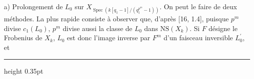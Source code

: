 \documentclass[9pt]{article}
\newcommand{\CanonText}[1]{\par{\fontsize{8.0}{9.35}\selectfont\RaggedRight #1\par}\vspace{2.2pt}}
\begin{document}
\begin{minipage}[t][\dimexpr\textheight-5pt\relax][t]{\textwidth}
\CanonText{a) Prolongement de \(L_{0}\) sur \(X_{\operatorname{Spec}(k[q_{1}-1]/(q_{1}^{p^{m}}-1))}\). On peut le faire de deux méthodes. La plus rapide consiste à observer que, d'après [16, 1.4], puisque \(p^{m}\) divise \(c_{1}(L_{0})\), \(p^{m}\) divise aussi la classe de \(L_{0}\) dans \(\mathrm{NS}(X_{k})\). Si \(F\) désigne le Frobenius de \(X_{k}\), \(L_{0}\) est donc l'image inverse par \(F^{m}\) d'un faisceau inversible \(L^{\prime}_{0}\), et}
\vfill
{\color{Accent}\hrule height 0.35pt}\vspace{3pt}
\end{minipage}
\newpage
\end{document}
